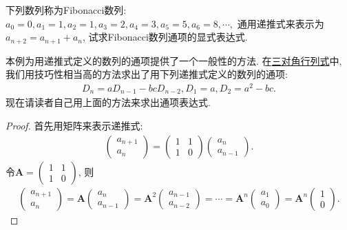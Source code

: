 \documentclass[../../main.tex]{subfiles}
\begin{document}
\begin{example}
下列数列称为Fibonacci数列:
\(a_{0}=0,a_{1}=1,a_{2}=1,a_{3}=2,a_{4}=3,a_{5}=5,a_{6}=8,\cdots,\)
通用递推式来表示为\(a_{n + 2}=a_{n + 1}+a_{n}\), 试求Fibonacci数列通项的显式表达式.
\end{example}
\begin{remark}
本例为用递推式定义的数列的通项提供了一个一般性的方法. 在\hyperref[三对角行列式]{三对角行列式}中, 我们用技巧性相当高的方法求出了用下列递推式定义的数列的通项:
\begin{align*}
D_{n}=aD_{n - 1}-bcD_{n - 2},D_{1}=a,D_{2}=a^{2}-bc.
\end{align*}
现在请读者自己用上面的方法来求出通项表达式. 
\end{remark}
\begin{proof}
首先用矩阵来表示递推式:
\begin{align*}
\begin{pmatrix}
a_{n + 1}\\
a_{n}
\end{pmatrix}=\begin{pmatrix}
1&1\\
1&0
\end{pmatrix}\begin{pmatrix}
a_{n}\\
a_{n - 1}
\end{pmatrix}.
\end{align*}
令\(\boldsymbol{A}=\begin{pmatrix}
1&1\\
1&0
\end{pmatrix}\), 则
\begin{align*}
\begin{pmatrix}
a_{n + 1}\\
a_{n}
\end{pmatrix}=\boldsymbol{A}\begin{pmatrix}
a_{n}\\
a_{n - 1}
\end{pmatrix}=\boldsymbol{A}^{2}\begin{pmatrix}
a_{n - 1}\\
a_{n - 2}
\end{pmatrix}=\cdots=\boldsymbol{A}^{n}\begin{pmatrix}
a_{1}\\
a_{0}
\end{pmatrix}=\boldsymbol{A}^{n}\begin{pmatrix}
1\\
0
\end{pmatrix}.
\end{align*}

\end{proof}
\end{document}
